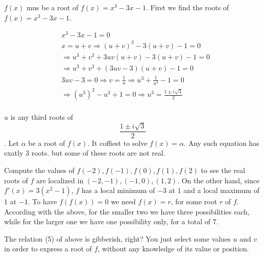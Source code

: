 \begin{solution}
	$f(x)$ mus be a root of $f(x)={{x}^{3}}-3x-1$. First we find the roots of  $f(x)={{x}^{3}}-3x-1$.

\begin{align}
  & {{x}^{3}}-3x-1=0 \\ 
 & x=u+v\Rightarrow {{(u+v)}^{3}}-3(u+v)-1=0 \\ 
 & \Rightarrow {{u}^{3}}+{{v}^{3}}+3uv(u+v)-3(u+v)-1=0 \\ 
 & \Rightarrow {{u}^{3}}+{{v}^{3}}+(3uv-3)(u+v)-1=0 \\ 
 & 3uv-3=0\Rightarrow v=\frac{1}{u}\Rightarrow {{u}^{3}}+\frac{1}{{{u}^{3}}}-1=0 \\ 
 & \Rightarrow {{({{u}^{3}})}^{2}}-{{u}^{3}}+1=0\Rightarrow {{u}^{3}}=\frac{1\pm i\sqrt{3}}{2} \\ 
\end{align}
 
$u$ is any third roots of 
\[\frac{1\pm i\sqrt{3}}{2}\]
.
Let $\alpha $ be a root of  $f(x)$. It coffiest to solve $f(x)=\alpha $.
Any such equation has exatly $3$ roots.
but some of these roots are not real.
\end{solution}



\begin{solution}
	Compute the values of $f(-2),f(-1),f(0),f(1),f(2)$ to see the real roots of $f$ are localized in $(-2,-1),(-1,0),(1,2)$. On the other hand, since $f'(x)=3(x^2-1)$, $f$ has a local minimum of $-3$ at $1$ and a local maximum of $1$ at $-1$. To have $f(f(x))=0$ we need $f(x)=r$, for some root $r$ of $f$. According with the above, for the smaller two we have three possibilities each, while for the larger one we have one possibility only, for a total of $7$.

The relation (5) of above is gibberish, right? You just select some values $u$ and $v$ in order to express a root of $f$, without any knowledge of its value or position.
\end{solution}



